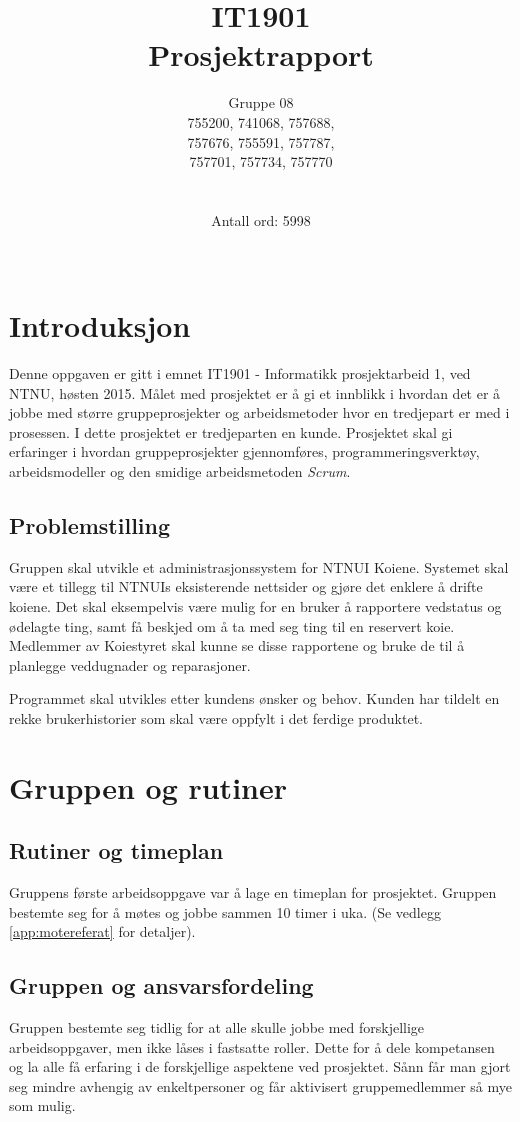 \documentclass[12pt,a4paper,norsk]{article}
\title{IT1901 \\ Prosjektrapport}
\author{Gruppe 08\\
    755200, 741068, 757688,\\
    757676, 755591, 757787,\\
    757701, 757734, 757770\\ \\ \\
    Antall ord: 5998 \\ \\}
\begin{document}
  \maketitle
  \newpage
  \tableofcontents
  \newpage
  \section{Introduksjon}

Denne oppgaven er gitt i emnet IT1901 - Informatikk prosjektarbeid 1, ved NTNU, høsten 2015. Målet med prosjektet er å gi et innblikk i hvordan det er å jobbe med større gruppeprosjekter og arbeidsmetoder hvor en tredjepart er med i prosessen. I dette prosjektet er tredjeparten en kunde. Prosjektet skal gi erfaringer i hvordan gruppeprosjekter gjennomføres, programmeringsverktøy, arbeidsmodeller og den smidige arbeidsmetoden \textit{Scrum}.

\subsection{Problemstilling}

Gruppen skal utvikle et administrasjonssystem for NTNUI Koiene. Systemet skal være et tillegg til NTNUIs eksisterende nettsider og gjøre det enklere å drifte koiene. Det skal eksempelvis være mulig for en bruker å rapportere vedstatus og ødelagte ting, samt få beskjed om å ta med seg ting til en reservert koie. Medlemmer av Koiestyret skal kunne se disse rapportene og bruke de til å planlegge veddugnader og reparasjoner.

Programmet skal utvikles etter kundens ønsker og behov. Kunden har tildelt en rekke brukerhistorier som skal være oppfylt i det ferdige produktet.

\section{Gruppen og rutiner}
\subsection{Rutiner og timeplan}

Gruppens første arbeidsoppgave var å lage en timeplan for prosjektet. Gruppen bestemte seg for å møtes og jobbe sammen 10 timer i uka. (Se vedlegg \cref{app:motereferat} for detaljer).

\subsection{Gruppen og ansvarsfordeling}
Gruppen bestemte seg tidlig for at alle skulle jobbe med forskjellige arbeidsoppgaver, men ikke låses i fastsatte roller. Dette for å dele kompetansen og la alle få erfaring i de forskjellige aspektene ved prosjektet. Sånn får man gjort seg mindre avhengig av enkeltpersoner og får aktivisert gruppemedlemmer så mye som mulig.
\end{document}
